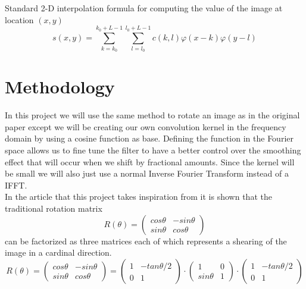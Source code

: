 \documentclass[]{usiinfbachelorproject}
\begin{document}
	Standard 2-D interpolation formula for computing the value of the image at location $(x,y)$
	\begin{equation}
		s(x,y) = \sum_{k = k_0}^{k_0+L-1}\sum_{l=l_0}^{l_0+L-1} c(k,l)\varphi(x-k)\varphi(y-l)
	\end{equation}
	
	\fi
	

	\section{Methodology}	
		In this project we will use the same method to rotate an image as in the original paper \cite{main_article} except we will be creating our own convolution kernel in the frequency domain by using a cosine function as base. Defining the function in the Fourier space allows us to fine tune the filter to have a better control over the smoothing effect that will occur when we shift by fractional amounts. Since the kernel will be small we will also just use a normal Inverse Fourier Transform instead of a IFFT. \\
		In the article that this project takes inspiration from it is shown that the traditional rotation matrix
	\begin{equation*}
		R(\theta) = 
		\begin{pmatrix}
			cos\theta & -sin\theta\\
			sin\theta & cos\theta
		\end{pmatrix}
	\end{equation*} 
	can be factorized as three matrices each of which represents a shearing of the image in a cardinal direction.
	\begin{equation*}
		R(\theta) = 
		\begin{pmatrix}
			cos\theta & -sin\theta\\
			sin\theta & cos\theta
		\end{pmatrix}
		=
		\begin{pmatrix}
			1 & -tan\theta/2\\
			0 & 1
		\end{pmatrix}
		\cdot
		\begin{pmatrix}
			1 & 0\\
			sin\theta & 1
		\end{pmatrix}
		\cdot
		\begin{pmatrix}
			1 & -tan\theta/2\\
			0 & 1
		\end{pmatrix}
	\end{equation*} 
	
\end{document}
